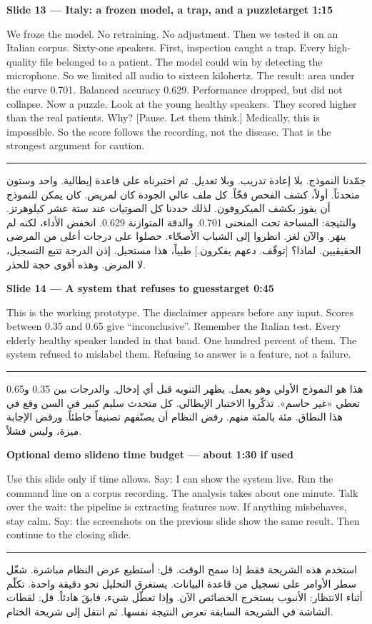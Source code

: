\documentclass[12pt,a4paper]{article}
\newcommand{\slidehead}[2]{%
\noindent\colorbox{honest!10}{\parbox{\dimexpr\textwidth-2\fboxsep}{%
\textbf{#1}\hfill\textbf{#2}}}\par\vspace{4pt}}
\newcommand{\arstart}{\par\vspace{6pt}\hrule\vspace{6pt}}
\begin{document}
\slidehead{Slide 13 --- Italy: a frozen model, a trap, and a puzzle}{target 1:15}
We froze the model. No retraining. No adjustment.
Then we tested it on an Italian corpus. Sixty-one speakers.
First, inspection caught a trap.
Every high-quality file belonged to a patient.
The model could win by detecting the microphone.
So we limited all audio to sixteen kilohertz.
The result: area under the curve 0.701.
Balanced accuracy 0.629.
Performance dropped, but did not collapse.
Now a puzzle. Look at the young healthy speakers.
They scored higher than the real patients. Why?
[Pause. Let them think.]
Medically, this is impossible.
So the score follows the recording, not the disease.
That is the strongest argument for caution.
\arstart
\begin{Arabic}
جمّدنا النموذج. بلا إعادة تدريب. وبلا تعديل.
ثم اختبرناه على قاعدة إيطالية. واحد وستون متحدثاً.
أولاً، كشف الفحص فخّاً.
كل ملف عالي الجودة كان لمريض.
كان يمكن للنموذج أن يفوز بكشف الميكروفون.
لذلك حددنا كل الصوتيات عند ستة عشر كيلوهرتز.
والنتيجة: المساحة تحت المنحنى \textenglish{0.701}.
والدقة المتوازنة \textenglish{0.629}.
انخفض الأداء، لكنه لم ينهَر.
والآن لغز. انظروا إلى الشباب الأصحّاء.
حصلوا على درجات أعلى من المرضى الحقيقيين. لماذا؟
[توقّف. دعهم يفكرون.]
طبياً، هذا مستحيل.
إذن الدرجة تتبع التسجيل، لا المرض.
وهذه أقوى حجة للحذر.
\end{Arabic}
\clearpage

\slidehead{Slide 14 --- A system that refuses to guess}{target 0:45}
This is the working prototype.
The disclaimer appears before any input.
Scores between 0.35 and 0.65 give ``inconclusive''.
Remember the Italian test.
Every elderly healthy speaker landed in that band.
One hundred percent of them.
The system refused to mislabel them.
Refusing to answer is a feature, not a failure.
\arstart
\begin{Arabic}
هذا هو النموذج الأولي وهو يعمل.
يظهر التنويه قبل أي إدخال.
والدرجات بين \textenglish{0.35} و\textenglish{0.65} تعطي «غير حاسم».
تذكّروا الاختبار الإيطالي.
كل متحدث سليم كبير في السن وقع في هذا النطاق.
مئة بالمئة منهم.
رفض النظام أن يصنّفهم تصنيفاً خاطئاً.
ورفض الإجابة ميزة، وليس فشلاً.
\end{Arabic}
\clearpage

\slidehead{Optional demo slide}{no time budget --- about 1:30 if used}
Use this slide only if time allows.
Say: I can show the system live.
Run the command line on a corpus recording.
The analysis takes about one minute.
Talk over the wait: the pipeline is extracting features now.
If anything misbehaves, stay calm.
Say: the screenshots on the previous slide show the same result.
Then continue to the closing slide.
\arstart
\begin{Arabic}
استخدم هذه الشريحة فقط إذا سمح الوقت.
قل: أستطيع عرض النظام مباشرة.
شغّل سطر الأوامر على تسجيل من قاعدة البيانات.
يستغرق التحليل نحو دقيقة واحدة.
تكلّم أثناء الانتظار: الأنبوب يستخرج الخصائص الآن.
وإذا تعطّل شيء، فابقَ هادئاً.
قل: لقطات الشاشة في الشريحة السابقة تعرض النتيجة نفسها.
ثم انتقل إلى شريحة الختام.
\end{Arabic}
\clearpage
\end{document}
